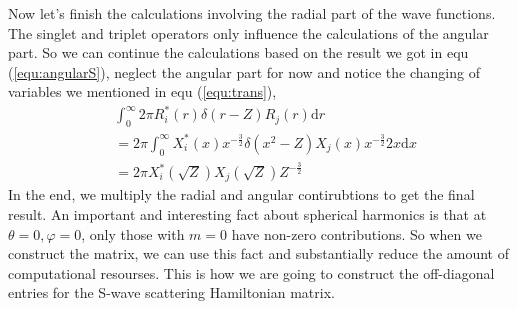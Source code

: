\documentclass[british,english]{article}
\numberwithin{equation}{section}
\numberwithin{figure}{section}
\begin{document}
Now let's finish the calculations involving the radial part of the wave functions. The singlet and triplet operators only influence the calculations of the angular part. So we can continue the calculations based on the result we got in equ (\ref{equ:angularS}), neglect the angular part for now and  notice the changing of variables we mentioned in equ (\ref{equ:trans}),
\begin{equation}
\begin{aligned}
&\int_0^{\infty} 2\pi R^*_i( r)\delta(r - Z)R_j(r)\mathrm dr\\
&= 2\pi \int_0^{\infty} X^*_i(x)x^{-\frac{3}{2}}\delta(x^2-Z)X_j(x)x^{-\frac{3}{2}}2x\mathrm dx\\
&= 2\pi X_i^*(\sqrt{Z})X_j(\sqrt{Z})Z^{-\frac{3}{2}}
\end{aligned}
\end{equation}
In the end, we multiply the radial and angular contirubtions to get the final result. An important and interesting fact about spherical harmonics is that at $\theta=0, \varphi=0$, only those with $m=0$ have non-zero contributions. So when we construct the matrix, we can use this fact and substantially reduce the amount of computational resourses. This is how we are going to construct the off-diagonal entries for the S-wave scattering Hamiltonian matrix.
\end{document}
